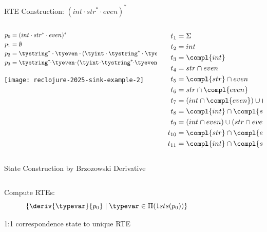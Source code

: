 \begin{frame}{RTE Construction: $(int \cdot str^{*} \cdot even)^{*}$}
  \begin{columns}
    \begin{column}{0.5\textwidth}
      \begin{align*}
        p_0 &= (int \cdot str^{*} \cdot even)^{*}\\
        p_1 &= \emptyset\\
        p_2 &= \tystring^{*} \cdot \tyeven \cdot (\tyint \cdot \tystring^{*} \cdot \tyeven)^{*}\\
        p_3 &= \tystring^{*}\!\!\cdot\! \tyeven\!\cdot\! (\tyint\! \cdot\! \tystring^{*}\!\!\cdot\! \tyeven)^{*}\! \reor (\tyint\! \cdot\! \tystring^{*}\!\!\cdot\!\! \tyeven)^{*}
      \end{align*}



      \texttt{[image: reclojure-2025-sink-example-2]}
    \end{column}
    \begin{column}{0.5\textwidth}
      \begin{align*}
        t_1 &= \Sigma\\
        t_2 &= int  \\
        t_3 &= \compl{int}\\
        t_4 &= str \cap even\\
        t_5 &= \compl{str} \cap even\\
        t_6 &= str \cap \compl{even}\\
        t_7 &= (int \cap \compl{even}) \cup (str \cap \compl{even})\\
        t_8   &=\compl{int} \cap \compl{str} \cap even\\
        t_9 &=(int \cap even) \cup (str \cap even)\\
        t_{10} &=\compl{str} \cap \compl{even}\\
        t_{11} &=\compl{int} \cap \compl{str} \cap \compl{even}
      \end{align*}
    \end{column}
  \end{columns}
\end{frame}

\begin{frame}{      State Construction by   Brzozowski Derivative}
  \begin{columns}
    \begin{column}{0.4\textwidth}
      Compute RTEs:
      \[\{\deriv{\typevar}{p_0} \mid \typevar \in \Pi(1sts(p_0))\}\]

      1:1 correspondence state to unique RTE
    \end{column}
    \begin{column}{0.6\textwidth}
      \scalebox{0.8}{}%
    \end{column}
  \end{columns}
\end{frame}


